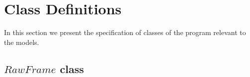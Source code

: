 \documentclass{article}
\begin{document}



\newpage


\appendix


\renewcommand{\red}[1]{#1}
\renewcommand{\blue}[1]{#1}
\renewcommand{\green}[1]{#1}
\renewcommand{\grey}[1]{#1}
\renewcommand{\purple}[1]{#1}


\section{Class Definitions}
\label{app:classes}

In this section we present the specification of {\OhCircus} classes of the program relevant to the models.



\subsection{$RawFrame$ class}
\label{app:RawFrame}\vspace{-1em}




\newpage

\end{document}
